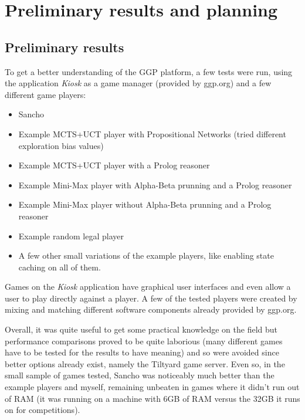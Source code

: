 \chapter{Preliminary results and planning}
\label{chapter:preliminary_results}

\section{Preliminary results}

To get a better understanding of the GGP platform, a few tests were run, using the application \textit{Kiosk} as a game manager (provided by ggp.org) and a few different game players:

\begin{itemize}

\item Sancho

\item Example MCTS+UCT player with Propositional Networks (tried different exploration bias values)

\item Example MCTS+UCT player with a Prolog reasoner

\item Example Mini-Max player with Alpha-Beta prunning and a Prolog reasoner

\item Example Mini-Max player without Alpha-Beta prunning and a Prolog reasoner

\item Example random legal player

\item A few other small variations of the example players, like enabling state caching on all of them.

\end{itemize}

Games on the \textit{Kiosk} application have graphical user interfaces and even allow a user to play directly against a player.
A few of the tested players were created by mixing and matching different software components already provided by ggp.org.

Overall, it was quite useful to get some practical knowledge on the field but performance comparisons proved to be quite laborious (many different games have to be tested for the results to have meaning) and so were avoided since better options already exist, namely the Tiltyard game server. Even so, in the small sample of games tested, Sancho was noticeably much better than the example players and myself, remaining unbeaten in games where it didn't run out of RAM (it was running on a machine with 6GB of RAM versus the 32GB it runs on for competitions).

